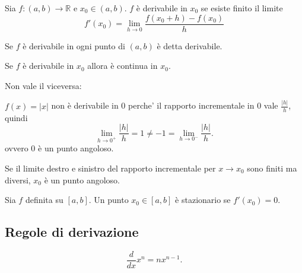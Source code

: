 \begin{definition}[Derivata]
    Sia $f\colon (a,b)\rightarrow\mathbb R$ e $x_0\in(a,b)$. $f$ è derivabile in $x_0$ se esiste finito il limite
    \begin{equation}\label{eq:limite_rapporto_incrementale}
        f'(x_0)=\lim_{h\rightarrow 0}\frac{f(x_0+h)-f(x_0)}{h}
    \end{equation}
\end{definition}

\begin{definition}
    Se $f$ è derivabile in ogni punto di $(a,b)$ è detta derivabile.
\end{definition}

\begin{theorem}
    Se $f$ è derivabile in $x_0$ allora è continua in $x_0$.
\end{theorem}

Non vale il viceversa:
\begin{example}
    $f(x)=|x|$ non è derivabile in 0 perche' il rapporto incrementale in 0 vale $\frac{|h|}{h}$, quindi
    \begin{equation*}
        \lim_{h\rightarrow 0^+}\frac{|h|}{h}=1\neq -1=\lim_{h\rightarrow 0^-}\frac{|h|}{h}.
    \end{equation*}
    ovvero 0 è un punto angoloso.
\end{example}

\begin{definition}
    Se il limite destro e sinistro del rapporto incrementale per $x\rightarrow x_0$ sono finiti ma diversi, $x_0$ è un punto angoloso.
\end{definition}

\begin{definition}
    Sia $f$ definita su $[a,b]$. Un punto $x_0\in[a,b]$ è stazionario se $f'(x_0)=0$.
\end{definition}

\subsection{Regole di derivazione}

\begin{theorem}
    \begin{equation*}
        \frac{d}{dx}x^n=nx^{n-1}.
    \end{equation*}
\end{theorem}

